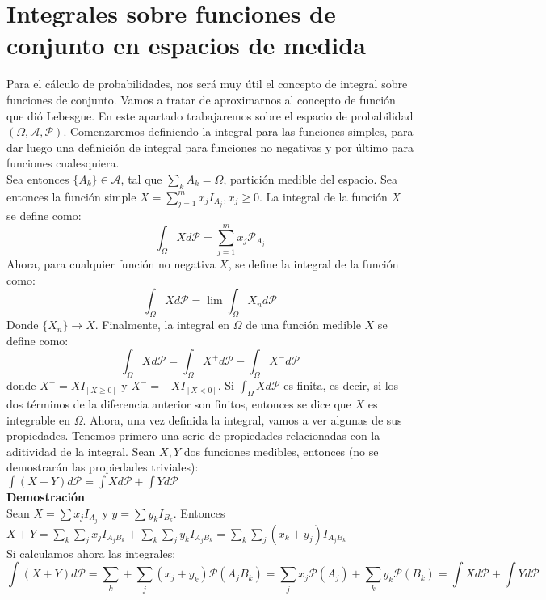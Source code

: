 \documentclass[12pt,a4paper]{book}
\begin{document}
\section{Integrales sobre funciones de conjunto en espacios de medida}
Para el cálculo de probabilidades, nos será muy útil el concepto de integral sobre funciones de conjunto. Vamos a tratar de aproximarnos al concepto de función que dió Lebesgue. En este apartado trabajaremos sobre el espacio de probabilidad $(\Omega, \mathcal{A}, \mathcal{P})$. Comenzaremos definiendo la integral para las funciones simples, para dar luego una definición de integral para funciones no negativas y por último para funciones cualesquiera.\\

Sea entonces $\{A_k\} \in \mathcal{A}$, tal que $\displaystyle \sum_k A_k = \Omega$, partición medible del espacio. Sea entonces la función simple $X = \displaystyle \sum_{j=1}^m x_jI_{A_j}, x_j \geq 0$. La integral de la función $X$ se define como:
$$\int_{\Omega} X d\mathcal{P} = \sum_{j=1}^m x_j\mathcal{P}_{A_j}$$
Ahora, para cualquier función no negativa $X$, se define la integral de la función como:
$$\int_{\Omega} X d\mathcal{P} = \lim \int_{\Omega}X_n d \mathcal{P}$$
Donde $\{X_{n}\} \to X$. Finalmente, la integral en $\Omega$ de una función medible $X$ se define como:
$$\int_{\Omega} X d\mathcal{P} = \int_{\Omega}X^{+} d\mathcal{P} - \int_{\Omega} X^{-} d\mathcal{P}$$
donde $X^{+} = XI_{[X\geq0]}$ y $X^{-} = -XI_{[X<0]}$. Si $\displaystyle \int_{\Omega}Xd\mathcal{P}$ es finita, es decir, si los dos términos de la diferencia anterior son finitos, entonces se dice que $X$ es integrable en $\Omega$. Ahora, una vez definida la integral, vamos a ver algunas de sus propiedades. Tenemos primero una serie de propiedades relacionadas con la aditividad de la integral. Sean $X,Y$ dos funciones medibles, entonces (no se demostrarán las propiedades triviales):\\

$\displaystyle \int (X+Y)d\mathcal{P} = \int Xd\mathcal{P} + \int Yd\mathcal{P}$\\

\textbf{Demostración}\\

Sean $X = \displaystyle \sum x_jI_{A_j}$ y $y = \displaystyle \sum y_kI_{B_k}$. Entonces $X+Y = \displaystyle \sum_k \sum_j x_j I_{A_jB_k} + \sum_k \sum_j y_k I_{A_jB_k} = \sum_k \sum_j (x_k+y_j) I_{A_jB_k}$\\

Si calculamos ahora las integrales:
$$ \int (X+Y)d\mathcal{P} = \sum_k + \sum_j (x_j + y_k) \mathcal{P}(A_jB_k) = \sum_j x_j \mathcal{P}(A_j) + \sum_k y_k \mathcal{P}(B_k) = \int Xd\mathcal{P} + \int Yd\mathcal{P}$$
\end{document}
